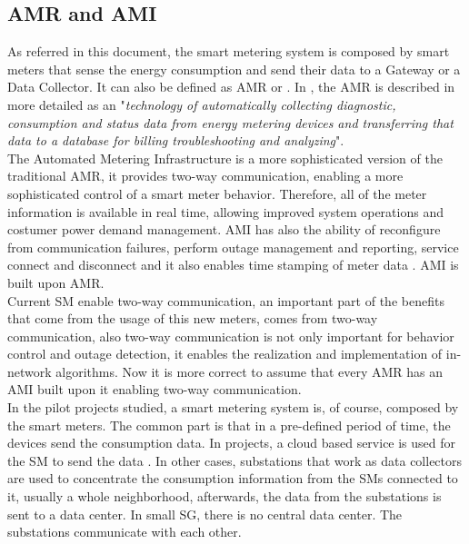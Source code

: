 \subsection{AMR and AMI}\label{subsec:amrami}
As referred in this document, the smart metering system is composed by smart meters that sense the energy consumption and send  their data to a Gateway or a Data Collector. It can also be defined as AMR or  . In \cite{journals/spm/ErkinTLP13}, the AMR is described in more detailed as an "\textit{technology of automatically collecting diagnostic, consumption and status data from energy metering devices and transferring that data to a database for billing troubleshooting and analyzing}".\\
 The Automated Metering Infrastructure is a more sophisticated version of the traditional AMR, it provides two-way communication, enabling a more sophisticated control of a smart meter behavior. Therefore, all of the meter information is available in real time, allowing improved system operations and  costumer power demand management\cite{journals/spm/ErkinTLP13}.  AMI has also the ability of reconfigure from communication failures, perform outage management and reporting, service connect and disconnect and it also enables time stamping of meter data \cite{hart2008using}. AMI is built upon AMR. \\
Current SM enable two-way communication, an important part of the benefits that come from the usage of this new meters, comes from two-way communication, also two-way communication is not only important for behavior control and outage detection, it enables the realization and implementation of in-network algorithms. Now it is more correct to assume that every AMR has an AMI built upon it enabling two-way communication.\\
In the pilot projects studied, a smart metering system is, of course, composed by the smart meters. The common part is that in a  pre-defined period of time, the devices send the consumption data. In projects, a cloud based service is used for the  SM to send the data . In other cases, substations that work as data collectors are used to concentrate  the consumption information from the SMs connected to it, usually a whole neighborhood, afterwards, the data from the substations is sent to a data center. In small SG, there is no central data center. The substations communicate with each other.\\ 



